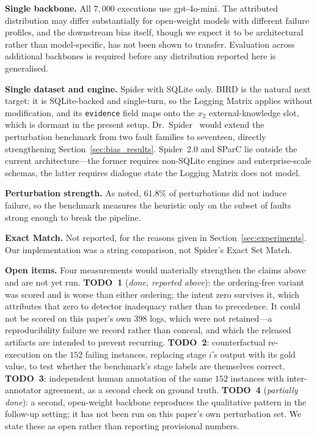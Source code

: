 \documentclass[conference]{IEEEtran}
\begin{document}
\noindent\textbf{Single backbone.} All $7{,}000$ executions use gpt-4o-mini. The
attributed distribution may differ substantially for open-weight models with
different failure profiles, and the downstream bias itself, though we expect
it to be architectural rather than model-specific, has not been shown to
transfer. Evaluation across additional backbones is required before any
distribution reported here is generalised.

\noindent\textbf{Single dataset and engine.} Spider with SQLite only. BIRD is
the natural next target: it is SQLite-backed and single-turn, so the Logging
Matrix applies without modification, and its \texttt{evidence} field maps onto
the $x_2$ external-knowledge slot, which is dormant in the present setup.
Dr.~Spider~\cite{chang_drspider_2023} would extend the perturbation benchmark
from two fault families to seventeen, directly strengthening
Section~\ref{sec:bias_results}. Spider~2.0 and SParC lie outside the current
architecture---the former requires non-SQLite engines and enterprise-scale
schemas, the latter requires dialogue state the Logging Matrix does not model.

\noindent\textbf{Perturbation strength.} As noted, $61.8\%$ of perturbations
did not induce failure, so the benchmark measures the heuristic only on the
subset of faults strong enough to break the pipeline.

\noindent\textbf{Exact Match.} Not reported, for the reasons given in
Section~\ref{sec:experiments}. Our implementation was a string comparison, not
Spider's Exact Set Match.

\noindent\textbf{Open items.} Four measurements would materially strengthen the
claims above and are not yet run. \textbf{TODO~1} (\emph{done, reported above}): the ordering-free variant was
scored and is worse than either ordering; the intent zero survives it, which
attributes that zero to detector inadequacy rather than to precedence. It could
not be scored on this paper's own $398$ logs, which were not retained---a
reproducibility failure we record rather than conceal, and which the released
artifacts are intended to prevent recurring.
\textbf{TODO~2}: counterfactual re-execution on the $152$ failing instances,
replacing stage $i$'s output with its gold value, to test whether the
benchmark's stage labels are themselves correct. \textbf{TODO~3}: independent
human annotation of the same $152$ instances with inter-annotator agreement, as
a second check on ground truth. \textbf{TODO~4} (\emph{partially done}): a second, open-weight backbone
reproduces the qualitative pattern in the follow-up setting; it has not been
run on this paper's own perturbation set.
We state these as open rather than reporting provisional numbers.
\end{document}
